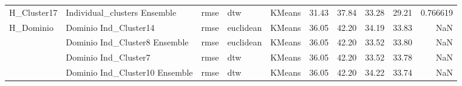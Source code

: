 \begin{tabular}{lllllrrrrr}
H\_Cluster17 & Individual\_clusters Ensemble & rmse & dtw &        KMeans &  31.43 &     37.84 &                  33.28 &          29.21 &  0.766619 \\
H\_Dominio & Dominio Ind\_Cluster14 & rmse & euclidean &        KMeans &  36.05 &     42.20 &                  34.19 &          33.83 &       NaN \\
          & Dominio Ind\_Cluster8 Ensemble & rmse & euclidean &        KMeans &  36.05 &     42.20 &                  33.52 &          33.80 &       NaN \\
          & Dominio Ind\_Cluster7 & rmse & dtw &        KMeans &  36.05 &     42.20 &                  33.52 &          33.78 &       NaN \\
          & Dominio Ind\_Cluster10 Ensemble & rmse & dtw &        KMeans &  36.05 &     42.20 &                  34.22 &          33.74 &       NaN \\
\bottomrule
\end{tabular}
